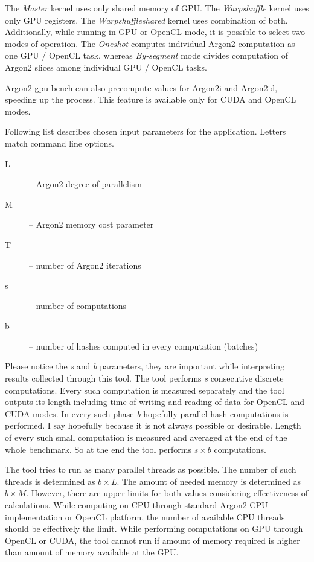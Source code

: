 \documentclass[nolof]{fithesis3}
\begin{document}
The \emph{Master} kernel uses only shared memory of GPU. The \emph{Warpshuffle} kernel uses only GPU registers. The \emph{Warpshuffleshared} kernel uses combination of both. Additionally, while running in GPU or OpenCL mode, it is possible to select two modes of operation. The \emph{Oneshot} computes individual Argon2 computation as one GPU / OpenCL task, whereas \emph{By-segment} mode divides computation of Argon2 slices among individual GPU / OpenCL tasks.

Argon2-gpu-bench can also precompute values for Argon2i and Argon2id, speeding up the process. This feature is available only for CUDA and OpenCL modes.

Following list describes chosen input parameters for the application. Letters match command line options.

\begin{description}
\item[L] -- Argon2 degree of parallelism

\item[M] -- Argon2 memory cost parameter

\item[T] -- number of Argon2 iterations

\item[s] -- number of computations

\item[b] -- number of hashes computed in every computation (batches)
\end{description}

Please notice the \emph{s} and \emph{b} parameters, they are important while interpreting results collected through this tool. The tool performs \emph{s} consecutive discrete computations. Every such computation is measured separately and the tool outputs its length including time of writing and reading of data for OpenCL and CUDA modes. In every such phase \emph{b} hopefully parallel hash computations is performed. I say hopefully because it is not always possible or desirable. Length of every such small computation is measured and averaged at the end of the whole benchmark.  So at the end the tool performs $s \times b$ computations.

The tool tries to run as many parallel threads as possible. The number of such threads is determined as $b \times L$. The amount of needed memory is determined as $b \times M$. However, there are upper limits for both values considering effectiveness of calculations. While computing on CPU through standard Argon2 CPU implementation or OpenCL platform, the number of available CPU threads should be effectively the limit. While performing computations on GPU through OpenCL or CUDA, the tool cannot run if amount of memory required is higher than amount of memory available at the GPU.
\end{document}
